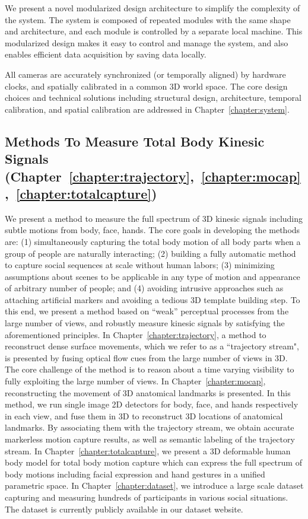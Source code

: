 We present a novel modularized design architecture to simplify the complexity of the system. The system is composed of repeated modules with the same shape and architecture, and each module is controlled by a separate local machine. This modularized design makes it easy to control and manage the system, and also enables efficient data acquisition by saving data locally. 

All cameras are accurately synchronized (or temporally aligned) by hardware clocks, and spatially calibrated in a common 3D world space. The core design choices and technical solutions including structural design, architecture, temporal calibration, and spatial calibration are addressed in Chapter~\ref{chapter:system}.

\subsection{Methods To Measure Total Body Kinesic Signals (Chapter~\ref{chapter:trajectory},~\ref{chapter:mocap},~\ref{chapter:totalcapture})}

We present a method to measure the full spectrum of 3D kinesic signals including subtle motions from body, face, hands. The core goals in developing the methods are: (1) simultaneously capturing the total body motion of all body parts when a group of people are naturally interacting; (2) building a fully automatic method to capture social sequences at scale without human labors; (3) minimizing assumptions about scenes to be applicable in any type of motion and appearance of arbitrary number of people; and (4) avoiding intrusive approaches such as attaching artificial markers and avoiding a tedious 3D template building step. To this end, we present a method based on ``weak'' perceptual processes from the large number of views, and robustly measure kinesic signals by satisfying the aforementioned principles. In Chapter~\ref{chapter:trajectory}, a method to reconstruct dense surface movements, which we refer to as a ``trajectory stream", is presented by fusing optical flow cues from the large number of views in 3D. The core challenge of the method is to reason about a time varying visibility to fully exploiting the large number of views. In Chapter~\ref{chapter:mocap}, reconstructing the movement of 3D anatomical landmarks is presented. In this method, we run single image 2D detectors for body, face, and hands respectively in each view, and fuse them in 3D to reconstruct 3D locations of anatomical landmarks. By associating them with the trajectory stream, we obtain accurate markerless motion capture results, as well as semantic labeling of the trajectory stream.  In Chapter~\ref{chapter:totalcapture}, we present a 3D deformable human body model for total body motion capture which can express the full spectrum of body motions including facial expression and hand gestures in a unified parametric space. In Chapter~\ref{chapter:dataset}, we introduce a large scale dataset capturing and measuring hundreds of participants in various social situations. The dataset is currently publicly available in our dataset website. 


